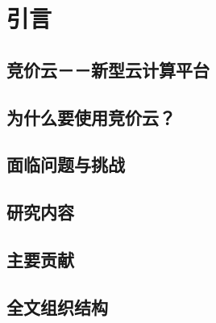 \chapter{引言}
\label{cha:intro}

\section{竞价云－－新型云计算平台}

\section{为什么要使用竞价云？}

\section{面临问题与挑战}

\section{研究内容}

\section{主要贡献}

\section{全文组织结构}
